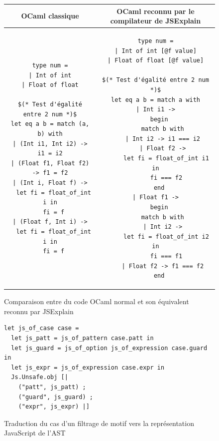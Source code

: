 \documentclass[a4paper,10pt]{article}
\begin{document}
\begin{figure}[hb]
\begin{tabular}[t]{| c | c |}
\hline
OCaml classique & OCaml reconnu par le compilateur de JSExplain \\
\hline
\begin{minipage}{0.40\textwidth}
\begin{lstlisting}
type num =
| Int of int
| Float of float

$(* Test d'égalité entre 2 num *)$
let eq a b = match (a, b) with
| (Int i1, Int i2) -> i1 = i2
| (Float f1, Float f2) -> f1 = f2
| (Int i, Float f) ->
  let fi = float_of_int i in
  fi = f
| (Float f, Int i) ->
  let fi = float_of_int i in
  fi = f
\end{lstlisting}
\end{minipage}
&
\begin{minipage}{0.47\textwidth}
\begin{lstlisting}
type num =
| Int of int [@f value]
| Float of float [@f value]

$(* Test d'égalité entre 2 num *)$
let eq a b = match a with
| Int i1 ->
  begin
    match b with
    | Int i2 -> i1 === i2
    | Float f2 ->
      let fi = float_of_int i1 in
      fi === f2
  end
| Float f1 ->
  begin
    match b with
    | Int i2 ->
      let fi = float_of_int i2 in
      fi === f1
    | Float f2 -> f1 === f2
  end
\end{lstlisting}
\end{minipage}
\\
\hline
\end{tabular}
\caption{Comparaison entre du code OCaml normal et son équivalent reconnu 
par JSExplain}
\label{code}
\end{figure}

\begin{figure}[hb]
\begin{lstlisting}
let js_of_case case =
  let js_patt = js_of_pattern case.patt in
  let js_guard = js_of_option js_of_expression case.guard in
  let js_expr = js_of_expression case.expr in
  Js.Unsafe.obj [|
    ("patt", js_patt) ;
    ("guard", js_guard) ;
    ("expr", js_expr) |]
\end{lstlisting}
\caption{Traduction du cas d'un filtrage de motif vers la 
représentation JavaScript de l'AST}
\label{js_of_case}
\end{figure}
\end{document}
